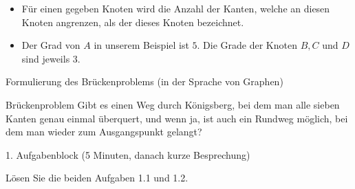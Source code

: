 \begin{frame}[fragile]{}
\begin{figure}[H]
\centering
{}
\end{figure}
\begin{itemize}[<+->]
    \item Für einen gegeben Knoten wird die Anzahl der Kanten, welche an diesen Knoten angrenzen, als der  dieses Knoten bezeichnet.
    \item Der Grad von $A$ in unserem Beispiel ist $5$. Die Grade der Knoten $B, C$ und $D$ sind jeweils $3$.
\end{itemize}
\end{frame}


\begin{frame}[fragile]{Formulierung des Brückenproblems (in der Sprache von Graphen)}
\begin{exampleblock}{Brückenproblem}
Gibt es einen Weg durch Königsberg, bei dem man alle sieben Kanten genau einmal überquert, und wenn ja, ist auch ein Rundweg möglich, bei dem man wieder zum Ausgangspunkt gelangt?
\end{exampleblock}
\end{frame}


\begin{frame}[fragile]{1. Aufgabenblock (5 Minuten, danach kurze Besprechung)}
\begin{center}
    Lösen Sie die beiden Aufgaben 1.1 und 1.2.
\end{center}
\end{frame}

